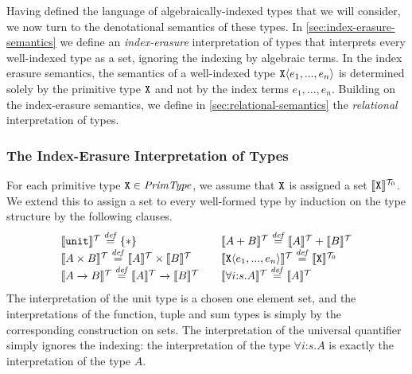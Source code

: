 Having defined the language of algebraically-indexed types that we
will consider, we now turn to the denotational semantics of these
types. In \autoref{sec:index-erasure-semantics} we define an
\emph{index-erasure} interpretation of types that interprets every
well-indexed type as a set, ignoring the indexing by algebraic
terms. In the index erasure semantics, the semantics of a well-indexed
type $\texttt{X}\langle e_1,...,e_n \rangle$ is determined solely by the primitive
type $\texttt{X}$ and not by the index terms $e_1,...,e_n$. Building
on the index-erasure semantics, we define in
\autoref{sec:relational-semantics} the \emph{relational}
interpretation of types.


\subsubsection{The Index-Erasure Interpretation of Types}
\label{sec:index-erasure-semantics}

For each primitive type $\texttt{X} \in \mathit{PrimType}$, we assume
that $\texttt{X}$ is assigned a set $\llbracket \texttt{X} \rrbracket^{\mathcal{T}_0}$. We
extend this to assign a set to every well-formed type by induction on
the type structure by the following clauses.
\begin{displaymath}
  \begin{array}{cc}
    \begin{array}{l}
      \llbracket \texttt{unit} \rrbracket^{\mathcal{T}} \stackrel{\mathit{def}}= \{*\} \\
      \llbracket A \times B \rrbracket^{\mathcal{T}} \stackrel{\mathit{def}}= \llbracket A \rrbracket^{\mathcal{T}} \times \llbracket B \rrbracket^{\mathcal{T}} \\
      \llbracket A \to B \rrbracket^{\mathcal{T}} \stackrel{\mathit{def}}= \llbracket A \rrbracket^{\mathcal{T}} \to \llbracket B \rrbracket^{\mathcal{T}} \\
    \end{array}
    &
    \begin{array}{l}
      \llbracket A + B \rrbracket^{\mathcal{T}} \stackrel{\mathit{def}}= \llbracket A \rrbracket^{\mathcal{T}} + \llbracket B \rrbracket^{\mathcal{T}} \\
      \llbracket \texttt{X}\langle e_1,...,e_n \rangle \rrbracket^{\mathcal{T}} \stackrel{\mathit{def}}= \llbracket \texttt{X} \rrbracket^{\mathcal{T}_0} \\
      \llbracket \forall i\mathord:s. A \rrbracket^{\mathcal{T}} \stackrel{\mathit{def}}= \llbracket A \rrbracket^{\mathcal{T}}
    \end{array}
  \end{array}
\end{displaymath}
The interpretation of the unit type is a chosen one element set, and
the interpretations of the function, tuple and sum types is simply by
the corresponding construction on sets. The interpretation of the
universal quantifier simply ignores the indexing: the interpretation
of the type $\forall i\mathord:s.A$ is exactly the interpretation of
the type $A$.

